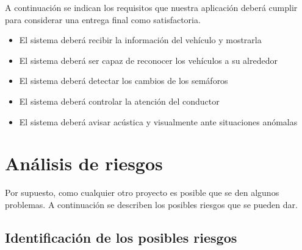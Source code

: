 A continuación se indican los requisitos que nuestra aplicación deberá cumplir para considerar una entrega final como satisfactoria.

\begin{itemize}
    \item El sistema deberá recibir la información del vehículo y mostrarla
    \item El sistema deberá ser capaz de reconocer los vehículos a su alrededor
    \item El sistema deberá detectar los cambios de los semáforos
    \item El sistema deberá controlar la atención del conductor
    \item El sistema deberá avisar acústica y visualmente ante situaciones anómalas
\end{itemize}


\section{Análisis de riesgos} \label{sec:analisisriesgos}

Por supuesto, como cualquier otro proyecto es posible que se den algunos problemas. A continuación se describen los posibles riesgos que se pueden dar.

\subsection{Identificación de los posibles riesgos}

